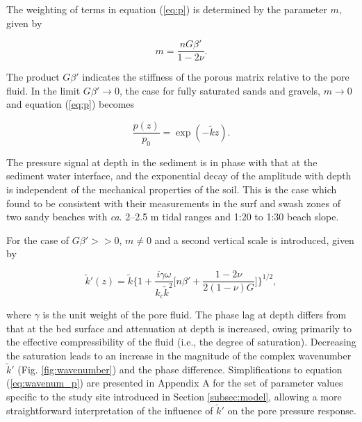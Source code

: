 The weighting of terms in equation (\ref{eq:p}) is determined by the parameter $m$, given by

\begin{equation}\label{eq:m}
m = \frac{nG\beta'}{1 - 2\nu}.
\end{equation}

\noindent The product $G\beta'$ indicates the stiffness of the porous matrix relative to the pore fluid. In the limit $G\beta' \rightarrow 0$, the case for fully saturated sands and gravels, $m \rightarrow 0$ and equation (\ref{eq:p}) becomes

\begin{equation}\label{eq:exp}
\frac{p(z)}{p_{0}} = \exp(-\tilde{k} z).
\end{equation}

\noindent The pressure signal at depth in the sediment is in phase with that at the sediment water interface, and the exponential decay of the amplitude with depth is independent of the mechanical properties of the soil. This is the case which \citet{Raubenheimer_etal1998} found to be consistent with their measurements in the surf and swash zones of two sandy beaches with \textit{ca}. 2--2.5 m tidal ranges and 1:20 to 1:30 beach slope.

For the case of $G\beta'>>0$, $m\neq0$ and a second vertical scale is introduced, given by

\begin{equation}\label{eq:wavenum_p}
\tilde{k}'(z) = \tilde{k}\Big\{1 + \frac{i\gamma \omega}{k_c \tilde{k}^2}\Big[n\beta' + \frac{1 - 2\nu}{2(1 - \nu)G}\Big]\Big\}^{1/2},
\end{equation}

\noindent where $\gamma$ is the unit weight of the pore fluid. The phase lag at depth differs from that at the bed surface and attenuation at depth is increased, owing primarily to the effective compressibility of the fluid (i.e., the degree of saturation). Decreasing the saturation leads to an increase in the magnitude of the complex wavenumber $\tilde{k}'$ (Fig. \ref{fig:wavenumber}) and the phase difference. Simplifications to equation (\ref{eq:wavenum_p}) are presented in Appendix A for the set of parameter values specific to the study site introduced in Section \ref{subsec:model}, allowing a more straightforward interpretation of the influence of $\tilde{k}'$ on the pore pressure response.

